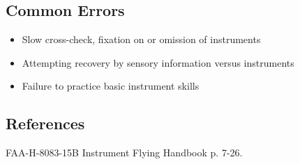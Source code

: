 \subsection{Common Errors}

\begin{itemize}
  \item Slow cross-check, fixation on or omission of instruments
  \item Attempting recovery by sensory information versus instruments
  \item Failure to practice basic instrument skills
\end{itemize}

\subsection{References}

FAA-H-8083-15B Instrument Flying Handbook p. 7-26.

